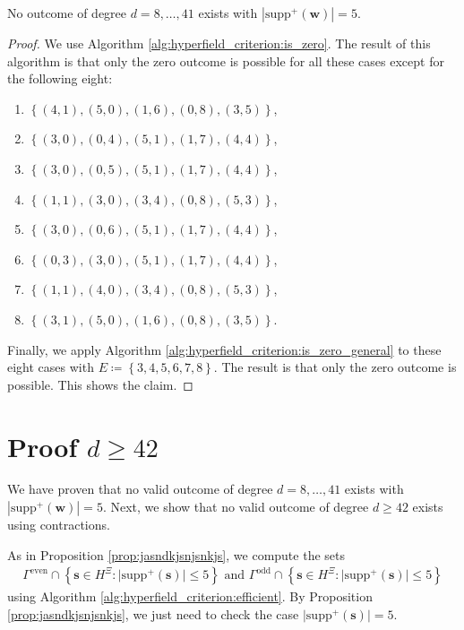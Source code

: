\begin{proposition}\label{prop:uiwuwinca}
    No outcome of degree \( d = 8, \dots, 41 \) exists with \( |\mathrm{supp}^+(\mathbf w)| = 5 \).
\end{proposition}

\begin{proof}
    We use Algorithm \ref{alg:hyperfield_criterion:is_zero}. The result of this algorithm is that only the zero outcome is possible for all these cases except for the following eight:
    \begin{enumerate}
        \item \( \left\{ (4, 1), (5, 0), (1, 6), (0, 8), (3, 5) \right\} \),
        \item \( \left\{  (3, 0), (0, 4), (5, 1), (1, 7), (4, 4) \right\} \),
        \item \( \left\{  (3, 0), (0, 5), (5, 1), (1, 7), (4, 4) \right\} \),
        \item \( \left\{   (1, 1), (3, 0), (3, 4), (0, 8), (5, 3) \right\} \),
        \item \( \left\{   (3, 0), (0, 6), (5, 1), (1, 7), (4, 4) \right\} \),
        \item \( \left\{   (0, 3), (3, 0), (5, 1), (1, 7), (4, 4) \right\} \),
        \item \( \left\{  (1, 1), (4, 0), (3, 4), (0, 8), (5, 3) \right\} \),
        \item \( \left\{  (3, 1), (5, 0), (1, 6), (0, 8), (3, 5) \right\} \).
    \end{enumerate}    
    Finally, we apply Algorithm \ref{alg:hyperfield_criterion:is_zero_general} to these eight cases with \( E \coloneqq \left\{ 3,4,5,6,7,8 \right\} \). The result is that only the zero outcome is possible. This shows the claim.
\end{proof}

\section{Proof \( d \geq 42 \)}

We have proven that no valid outcome of degree \( d = 8, \dots, 41 \) exists with \( |\mathrm{supp}^+(\mathbf w)| = 5 \). Next, we show that no valid outcome of degree \( d \geq 42 \) exists using contractions.

As in Proposition \ref{prop:jasndkjsnjsnkjs}, we compute the sets 
\begin{gather*}
    \Gamma^{\mathrm{even}} \cap \left\{ \mathbf{s} \in H^{\Xi} : \lvert \mathrm{supp}^+(\mathbf{s}) \rvert \leq 5 \right\} \text{ and }
    \Gamma^{\mathrm{odd}} \cap \left\{ \mathbf{s} \in H^{\Xi} : \lvert \mathrm{supp}^+(\mathbf{s}) \rvert \leq 5 \right\} 
\end{gather*}
using Algorithm \ref{alg:hyperfield_criterion:efficient}. By Proposition \ref{prop:jasndkjsnjsnkjs}, we just need to check the case \( \lvert \mathrm{supp}^+(\mathbf{s}) \rvert = 5 \).



